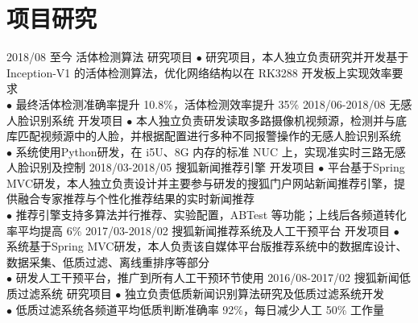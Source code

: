 \documentclass[a4paper,10pt]{professional-cv-cn}
\begin{document}
\section{项目研究}
\begin{entrylist}
  \entry
    {2018/08 至今}
    {活体检测算法}
    {研究项目}
    {$\bullet$ 研究项目，本人独立负责研究并开发基于 Inception-V1 的活体检测算法，优化网络结构以在 RK3288 开发板上实现效率要求 \\
    $\bullet$ 最终活体检测准确率提升 10.8\%，活体检测效率提升 35\%}
  \entry
    {2018/06-2018/08}
    {无感人脸识别系统}
    {开发项目}
    {$\bullet$ 本人独立负责研发读取多路摄像机视频源，检测并与底库匹配视频源中的人脸，并根据配置进行多种不同报警操作的无感人脸识别系统 \\
    $\bullet$ 系统使用Python研发，在 i5U、8G 内存的标准 NUC 上，实现准实时三路无感人脸识别及控制}
  \entry
    {2018/03-2018/05}
    {搜狐新闻推荐引擎}
    {开发项目}
    {$\bullet$ 平台基于Spring MVC研发，本人独立负责设计并主要参与研发的搜狐门户网站新闻推荐引擎，提供融合专家推荐与个性化推荐结果的实时新闻推荐 \\
    $\bullet$ 推荐引擎支持多算法并行推荐、实验配置，ABTest 等功能；上线后各频道转化率平均提高 6\%}
  \entry
    {2017/03-2018/02}
    {搜狐新闻推荐系统及人工干预平台}
    {开发项目}
    {$\bullet$ 系统基于Spring MVC研发，本人负责该自媒体平台版推荐系统中的数据库设计、数据采集、低质过滤、离线重排序等部分 \\
    $\bullet$ 研发人工干预平台，推广到所有人工干预环节使用}
  \entry
    {2016/08-2017/02}
    {搜狐新闻低质过滤系统}
    {研究项目}
    {$\bullet$ 独立负责低质新闻识别算法研究及低质过滤系统开发 \\
    $\bullet$ 低质过滤系统各频道平均低质判断准确率 92\%，每日减少人工 50\% 工作量}
\end{entrylist}
\end{document}

